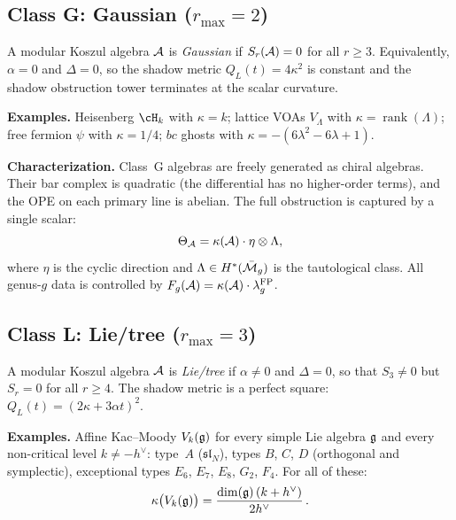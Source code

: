 \medskip

\subsection{Class G: Gaussian ($r_{\max} = 2$)}

\begin{definition}\label{def:class-G}
A modular Koszul algebra $\mathcal{A}$ is \emph{Gaussian} if
$S_r(\mathcal{A}) = 0$ for all $r \geq 3$. Equivalently,
$\alpha = 0$ and $\Delta = 0$, so the shadow metric
$Q_L(t) = 4\kappa^2$ is constant and the shadow obstruction tower
terminates at the scalar curvature.
\end{definition}

\noindent\textbf{Examples.} Heisenberg $\cH_k$ with $\kappa = k$;
lattice VOAs $V_\Lambda$ with $\kappa = \operatorname{rank}(\Lambda)$;
free fermion $\psi$ with $\kappa = 1/4$;
$bc$ ghosts with $\kappa = -(6\lambda^2 - 6\lambda + 1)$.

\noindent\textbf{Characterization.}
Class~G algebras are freely generated as chiral algebras. Their bar
complex is quadratic (the differential has no higher-order terms),
and the OPE on each primary line is abelian. The full obstruction
is captured by a single scalar:
\[
\Theta_{\mathcal{A}} = \kappa(\mathcal{A}) \cdot \eta \otimes \Lambda,
\]
where $\eta$ is the cyclic direction and $\Lambda \in H^*(\bar{\mathcal{M}}_g)$
is the tautological class. All genus-$g$ data is controlled by
$F_g(\mathcal{A}) = \kappa(\mathcal{A}) \cdot \lambda_g^{\mathrm{FP}}$.

\medskip

\subsection{Class L: Lie/tree ($r_{\max} = 3$)}

\begin{definition}\label{def:class-L}
A modular Koszul algebra $\mathcal{A}$ is \emph{Lie/tree} if
$\alpha \neq 0$ and $\Delta = 0$, so that $S_3 \neq 0$
but $S_r = 0$ for all $r \geq 4$. The shadow metric is
a perfect square:
$Q_L(t) = (2\kappa + 3\alpha t)^2$.
\end{definition}

\noindent\textbf{Examples.} Affine Kac--Moody $V_k(\mathfrak{g})$ for every
simple Lie algebra $\mathfrak{g}$ and every non-critical level
$k \neq -h^\vee$: type~$A$ ($\mathfrak{sl}_N$),
types $B$, $C$, $D$ (orthogonal and symplectic),
exceptional types $E_6$, $E_7$, $E_8$, $G_2$, $F_4$.
For all of these:
\[
\kappa\bigl(V_k(\mathfrak{g})\bigr)
= \frac{\dim(\mathfrak{g})\,(k + h^\vee)}{2h^\vee}\,.
\]

